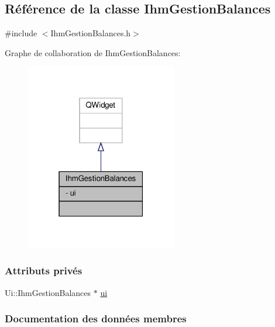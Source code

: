 \hypertarget{class_ihm_gestion_balances}{}\subsection{Référence de la classe Ihm\+Gestion\+Balances}
\label{class_ihm_gestion_balances}


{\ttfamily \#include $<$Ihm\+Gestion\+Balances.\+h$>$}



Graphe de collaboration de Ihm\+Gestion\+Balances\+:\nopagebreak
\begin{figure}[H]
\begin{center}
\leavevmode
\includegraphics[width=187pt]{class_ihm_gestion_balances__coll__graph}
\end{center}
\end{figure}
\subsubsection*{Attributs privés}
\begin{DoxyCompactItemize}
\item 
Ui\+::\+Ihm\+Gestion\+Balances $\ast$ \hyperlink{class_ihm_gestion_balances_a757ba93a01d5ac497f74e3a39b2eabde}{ui}
\end{DoxyCompactItemize}


\subsubsection{Documentation des données membres}
\mbox{\label{class_ihm_gestion_balances_a757ba93a01d5ac497f74e3a39b2eabde}} 
